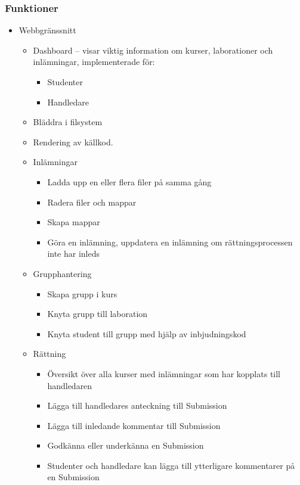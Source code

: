 \subsubsection{Funktioner}
\begin{itemize}
	\item Webbgränssnitt
	\begin{itemize}
		\item Dashboard – visar viktig information om kurser, laborationer och inlämningar, implementerade för:
		\begin{itemize}
			\item Studenter
			\item Handledare
		\end{itemize}
		\item Bläddra i filsystem
		\item Rendering av källkod.
		\item Inlämningar
		\begin{itemize}
			\item Ladda upp en eller flera filer på samma gång
			\item Radera filer och mappar
			\item Skapa mappar
			\item Göra en inlämning, uppdatera en inlämning om rättningsprocessen inte har inleds
		\end{itemize}
		\item Grupphantering
		\begin{itemize}
			\item Skapa grupp i kurs
            \item Knyta grupp till laboration
            \item Knyta student till grupp med hjälp av inbjudningskod
		\end{itemize}
		\item Rättning
		\begin{itemize}
			\item Översikt över alla kurser med inlämningar som har kopplats till handledaren
            \item Lägga till handledares anteckning till Submission
            \item Lägga till inledande kommentar till Submission
            \item Godkänna eller underkänna en Submission
            \item Studenter och handledare kan lägga till ytterligare kommentarer på en Submission
		\end{itemize}
	\end{itemize}
\end{itemize}

